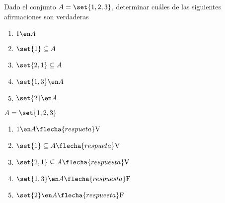 \begin{enunciado}{\ejercicio}
  Dado el conjunto $A = \set{1,2,3}$, determinar cuáles de las siguientes afirmaciones son verdaderas

  \begin{multicols}{5}
    \begin{enumerate}[label=(\roman*)]
      \item $1 \en A $
      \item $\set{1} \subseteq A $
      \item $\set{2,1} \subseteq A $
      \item $\set{1,3} \en A $
      \item $\set{2} \en A $
    \end{enumerate}
  \end{multicols}

\end{enunciado}

$A = \set{1,2,3}$
\begin{multicols}{3}
  \begin{enumerate}[label=(\roman*)]
    \item $1 \en A \flecha{respueta} \text{V}$
    \item $\set{1} \subseteq A \flecha{respueta} \text{V}$
    \item $\set{2,1} \subseteq A \flecha{respuesta} \text{V}$
    \item $\set{1,3} \en A \flecha{respuesta} \text{F}$
    \item $\set{2} \en A \flecha{respuesta} \text{F}$
  \end{enumerate}
\end{multicols}

\begin{aportes}
  \item {}
\end{aportes}
